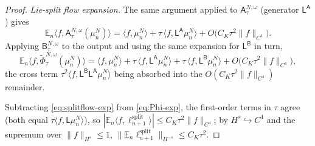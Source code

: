 \documentclass[a4paper,fleqn]{cas-sc}
\theoremstyle{definition}
\theoremstyle{remark}
\begin{document}
\begin{proof}
\emph{Lie-split flow expansion.} The same argument applied to $\mathsf A^{N,\omega}_\tau$
(generator $\mathsf L^{\mathsf A}$) gives
\[
\mathbb E_n\langle f,\mathsf A^{N,\omega}_\tau(\mu^N_n)\rangle
=\langle f,\mu^N_n\rangle+\tau\,\langle f,\mathsf L^{\mathsf A}\mu^N_n\rangle
+O\bigl(C_K\tau^2\|f\|_{C^4}\bigr).
\]
Applying $\mathsf B^{N,\omega}_\tau$ to the output and using the same expansion
for $\mathsf L^{\mathsf B}$ in turn,
\begin{equation}\label{eq:splitflow-exp}
\mathbb E_n\langle f,\widetilde\Phi^{N,\omega}_\tau(\mu^N_n)\rangle
=\langle f,\mu^N_n\rangle+\tau\,\langle f,\mathsf L^{\mathsf A}\mu^N_n\rangle
+\tau\,\langle f,\mathsf L^{\mathsf B}\mu^N_n\rangle
+O\bigl(C_K\tau^2\|f\|_{C^4}\bigr),
\end{equation}
the cross term $\tau^2\langle f,\mathsf L^{\mathsf B}\mathsf L^{\mathsf A}\mu^N_n\rangle$
being absorbed into the $O(C_K\tau^2\|f\|_{C^4})$ remainder.

Subtracting \eqref{eq:splitflow-exp} from \eqref{eq:Phi-exp}, the first-order
terms in $\tau$ agree (both equal $\tau\langle f,\mathsf L\mu^N_n\rangle$), so
$|\mathbb E_n\langle f,\ell^{\mathrm{split}}_{n+1}\rangle|\le C_K\tau^2\|f\|_{C^4}$;
by $H^s\hookrightarrow C^4$ and the supremum over $\|f\|_{H^s}\le1$,
$\|\mathbb E_n\ell^{\mathrm{split}}_{n+1}\|_{H^{-s}}\le C_K\tau^2$.


\end{proof}
\end{document}
